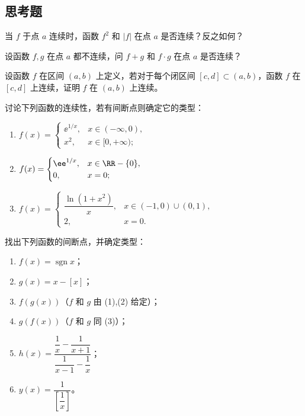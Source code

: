 \subsection{思考题}

\begin{xthought}[1]
当 $f$ 于点 $a$ 连续时，函数 $f^2$ 和 $|f|$ 在点 $a$ 是否连续？反之如何？
\end{xthought}

\begin{xthought}[2]
设函数 $f,g$ 在点 $a$ 都不连续，问 $f+g$ 和 $f\cdot g$ 在点 $a$ 是否连续？
\end{xthought}

\begin{xthought}[3]
设函数 $f$ 在区间 $(a,b)$ 上定义，若对于每个闭区间 $[c,d]\subset(a,b)$，函数 $f$ 在 $[c,d]$ 上连续，证明 $f$ 在 $(a,b)$ 上连续。
\end{xthought}

\begin{xthought}[4]
讨论下列函数的连续性，若有间断点则确定它的类型：
  \begin{enumerate}[label=(\arabic*)]
    \item $f(x)=\begin{cases}\ee^{1/x},&x\in(-\infty,0),\\x^2,&x\in[0,+\infty);\end{cases}$
    \item $f(x)=\begin{cases}\ee^{1/x},&x\in\RR-\{0\},\\0,&x=0;\end{cases}$
    \item $f(x)=\begin{cases}\dfrac{\ln(1+x^2)}{x},&x\in(-1,0)\cup(0,1),\\2,&x=0.\end{cases}$
  \end{enumerate}
\end{xthought}

\begin{xthought}[5]
找出下列函数的间断点，并确定类型：
  \begin{enumerate}[label=(\arabic*)]
    \item $f(x)=\operatorname{sgn}x$；
    \item $g(x)=x-[x]$；
    \item $f(g(x))$（$f$ 和 $g$ 由 (1),(2) 给定）；
    \item $g(f(x))$（$f$ 和 $g$ 同 (3)）；
    \item $h(x)=\dfrac{\dfrac1x-\dfrac1{x+1}}{\dfrac1{x-1}-\dfrac1x}$；
    \item $y(x)=\dfrac{1}{\left[\dfrac1x\right]}$。
  \end{enumerate}
\end{xthought}

